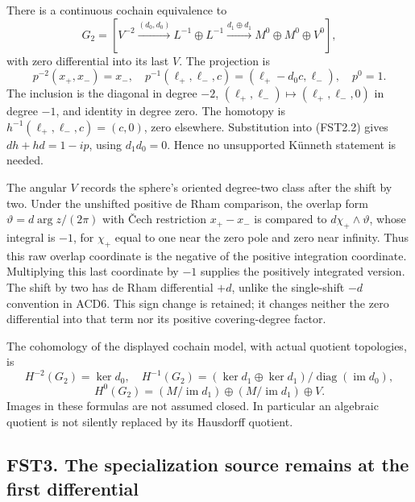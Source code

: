 There is a continuous cochain equivalence to \[
G_2=[V^{-2}\xrightarrow{(d_0,d_0)}L^{-1}\oplus L^{-1}
\xrightarrow{d_1\oplus d_1}M^0\oplus M^0\oplus V^0],
\tag{FST2.3}
\] with zero differential into its last \(V\). The projection is \[
p^{-2}(x_+,x_-)=x_-,\quad
p^{-1}(\ell_+,\ell_-,c)=(\ell_+-d_0c,\ell_-),\quad p^0=1.
\tag{FST2.4}
\] The inclusion is the diagonal in degree \(-2\),
\((\ell_+,\ell_-)\mapsto(\ell_+,\ell_-,0)\) in degree \(-1\), and
identity in degree zero. The homotopy is
\(h^{-1}(\ell_+,\ell_-,c)=(c,0)\), zero elsewhere. Substitution into
(FST2.2) gives \(dh+hd=1-ip\), using \(d_1d_0=0\). Hence no unsupported
Künneth statement is needed.

The angular \(V\) records the sphere's oriented degree-two class after
the shift by two. Under the unshifted positive de Rham comparison, the
overlap form \(\vartheta=d\arg z/(2\pi)\) with Čech restriction
\(x_+-x_-\) is compared to \(d\chi_+\wedge\vartheta\), whose integral is
\(-1\), for \(\chi_+\) equal to one near the zero pole and zero near
infinity. Thus this raw overlap coordinate is the negative of the
positive integration coordinate. Multiplying this last coordinate by
\(-1\) supplies the positively integrated version. The shift by two has
de Rham differential \(+d\), unlike the single-shift \(-d\) convention
in ACD6. This sign change is retained; it changes neither the zero
differential into that term nor its positive covering-degree factor.

The cohomology of the displayed cochain model, with actual quotient
topologies, is \[
H^{-2}(G_2)=\ker d_0,
\quad H^{-1}(G_2)=(\ker d_1\oplus\ker d_1)/\operatorname{diag}(\operatorname{im}d_0),
\] \[
H^0(G_2)=(M/\operatorname{im}d_1)\oplus(M/\operatorname{im}d_1)\oplus V.
\tag{FST2.5}
\] Images in these formulas are not assumed closed. In particular an
algebraic quotient is not silently replaced by its Hausdorff quotient.

\subsection{FST3. The specialization source remains at the first
differential}\label{fst3.-the-specialization-source-remains-at-the-first-differential}

